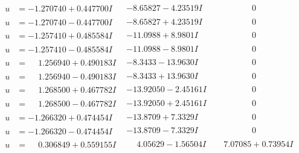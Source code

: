 \documentclass[1p]{elsarticle_modified}
\theoremstyle{definition}
\begin{document}
$$\begin{array}{c|c|c}
\begin{aligned}
u &= -1.270740 + 0.447700 I\end{aligned}
 & -8.65827 - 4.23519 I & \phantom{-0.000000 } 0 \\ \hline\begin{aligned}
u &= -1.270740 - 0.447700 I\end{aligned}
 & -8.65827 + 4.23519 I & \phantom{-0.000000 } 0 \\ \hline\begin{aligned}
u &= -1.257410 + 0.485584 I\end{aligned}
 & -11.0988 + 8.9801 I & \phantom{-0.000000 } 0 \\ \hline\begin{aligned}
u &= -1.257410 - 0.485584 I\end{aligned}
 & -11.0988 - 8.9801 I & \phantom{-0.000000 } 0 \\ \hline\begin{aligned}
u &= \phantom{-}1.256940 + 0.490183 I\end{aligned}
 & -8.3433 - 13.9630 I & \phantom{-0.000000 } 0 \\ \hline\begin{aligned}
u &= \phantom{-}1.256940 - 0.490183 I\end{aligned}
 & -8.3433 + 13.9630 I & \phantom{-0.000000 } 0 \\ \hline\begin{aligned}
u &= \phantom{-}1.268500 + 0.467782 I\end{aligned}
 & -13.92050 - 2.45161 I & \phantom{-0.000000 } 0 \\ \hline\begin{aligned}
u &= \phantom{-}1.268500 - 0.467782 I\end{aligned}
 & -13.92050 + 2.45161 I & \phantom{-0.000000 } 0 \\ \hline\begin{aligned}
u &= -1.266320 + 0.474454 I\end{aligned}
 & -13.8709 + 7.3329 I & \phantom{-0.000000 } 0 \\ \hline\begin{aligned}
u &= -1.266320 - 0.474454 I\end{aligned}
 & -13.8709 - 7.3329 I & \phantom{-0.000000 } 0 \\ \hline\begin{aligned}
u &= \phantom{-}0.306849 + 0.559155 I\end{aligned}
 & \phantom{-}4.05629 - 1.56504 I & \phantom{-}7.07085 + 0.73954 I \\ \hline\begin{aligned}

\end{aligned}
\end{array}$$
\end{document}
